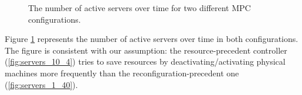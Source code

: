 \begin{figure}[h]
\centering 
{}
		\caption{The number of active servers over time for two different MPC configurations.}
		\label{fig:case_study_one_number_of_servers}  
\end{figure}
Figure \ref{fig:case_study_one_number_of_servers} represents the number of active servers over time in both configurations.
The figure is consistent with our assumption: the resource-precedent controller (\ref{fig:servers_10_4}) tries to save resources by deactivating/activating physical machines more frequently than the reconfiguration-precedent one (\ref{fig:servers_1_40}).


